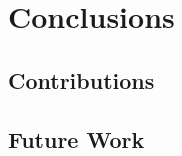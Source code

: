 \chapter{Conclusions} \label{chap:concl}

\section*{}

\section{Contributions}

\section{Future Work}
